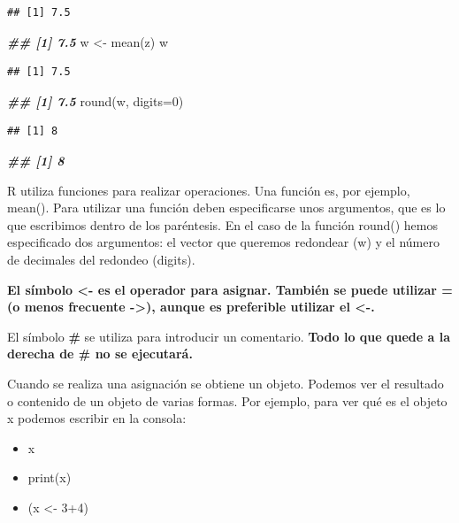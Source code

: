 \documentclass[
]{book}
\newenvironment{Shaded}{\begin{snugshade}}{\end{snugshade}}
\newcommand{\AttributeTok}[1]{\textcolor[rgb]{0.77,0.63,0.00}{#1}}
\newcommand{\DecValTok}[1]{\textcolor[rgb]{0.00,0.00,0.81}{#1}}
\newcommand{\DocumentationTok}[1]{\textcolor[rgb]{0.56,0.35,0.01}{\textbf{\textit{#1}}}}
\newcommand{\FunctionTok}[1]{\textcolor[rgb]{0.00,0.00,0.00}{#1}}
\newcommand{\NormalTok}[1]{#1}
\newcommand{\OtherTok}[1]{\textcolor[rgb]{0.56,0.35,0.01}{#1}}
\begin{document}
\begin{verbatim}
## [1] 7.5
\end{verbatim}

\begin{Shaded}
\begin{Highlighting}[]
\DocumentationTok{\#\# [1] 7.5}
\NormalTok{w }\OtherTok{\textless{}{-}} \FunctionTok{mean}\NormalTok{(z)}
\NormalTok{w}
\end{Highlighting}
\end{Shaded}

\begin{verbatim}
## [1] 7.5
\end{verbatim}

\begin{Shaded}
\begin{Highlighting}[]
\DocumentationTok{\#\# [1] 7.5}
\FunctionTok{round}\NormalTok{(w, }\AttributeTok{digits=}\DecValTok{0}\NormalTok{)}
\end{Highlighting}
\end{Shaded}

\begin{verbatim}
## [1] 8
\end{verbatim}

\begin{Shaded}
\begin{Highlighting}[]
\DocumentationTok{\#\# [1] 8}
\end{Highlighting}
\end{Shaded}

R utiliza funciones para realizar operaciones. Una función es, por ejemplo, mean(). Para utilizar una función deben especificarse unos argumentos, que es lo que escribimos dentro de los paréntesis. En el caso de la función round() hemos especificado dos argumentos: el vector que queremos redondear (w) y el número de decimales del redondeo (digits).

\textbf{El símbolo \textless- es el operador para asignar. También se puede utilizar = (o menos frecuente -\textgreater), aunque es preferible utilizar el \textless-.}

El símbolo \textbf{\#} se utiliza para introducir un comentario. \textbf{Todo lo que quede a la derecha de \# no se ejecutará.}

Cuando se realiza una asignación se obtiene un objeto. Podemos ver el resultado o contenido de un objeto de varias formas. Por ejemplo, para ver qué es el objeto x podemos escribir en la consola:

\begin{itemize}
\item
  x
\item
  print(x)
\item
  (x \textless- 3+4)
\end{itemize}
\end{document}
